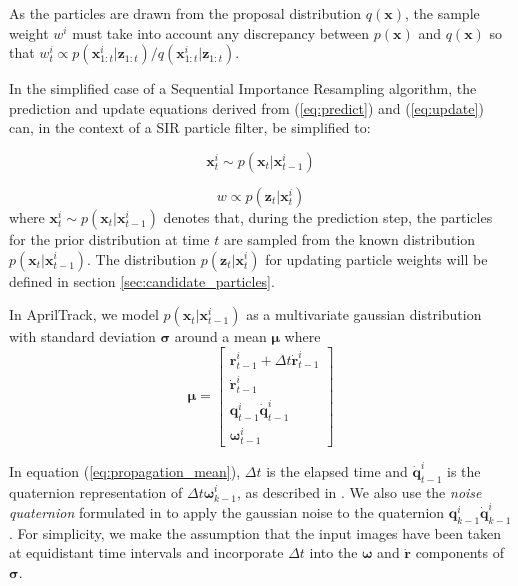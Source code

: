 \documentclass[letterpaper, 10 pt, conference]{ieeeconf}
\renewcommand{\vec}[1]{\boldsymbol{#1}}
\renewcommand{\eqref}[1]{\textup{{\normalfont(\ref{#1}}\normalfont)}}
\begin{document}
As the particles are drawn from the proposal distribution $q(\vec{x})$, the sample weight $w^i$ must take into account any discrepancy between $p(\vec{x})$ and $q(\vec{x})$ so that $w^i_t \propto p(\vec{x}^i_{1:t}|\vec{z}_{1:t})/q(\vec{x}^i_{1:t}|\vec{z}_{1:t})$.

In the simplified case of a Sequential Importance Resampling algorithm, the prediction and update equations derived from \eqref{eq:predict} and \eqref{eq:update} can, in the context of a SIR particle filter, be simplified to:

\begin{equation}
	\vec{x}^i_t \sim p(\vec{x}_t|\vec{x}^i_{t-1})
\end{equation}

\begin{equation}
	w \propto p(\vec{z}_t|\vec{x}^i_t)
\end{equation}
where $\vec{x}^i_t \sim p(\vec{x}_t|\vec{x}^i_{t-1})$ denotes that, during the prediction step, the particles for the prior distribution at time $t$ are sampled from the known distribution $p(\vec{x}_t|\vec{x}^i_{t-1})$. The distribution $p(\vec{z}_t|\vec{x}^i_t)$ for updating particle weights will be defined in section \ref{sec:candidate_particles}.

In AprilTrack, we model $p(\vec{x}_t|\vec{x}^i_{t-1})$ as a multivariate gaussian distribution with standard deviation $\vec{\sigma}$ around a mean $\vec{\mu}$ where
\begin{equation} \label{eq:propagation_mean}
\vec{\mu} = 
\begin{bmatrix} 
	\vec{r}^i_{t-1} + \Delta t \dot{\vec{r}}^i_{t-1} \\
 	\dot{\vec{r}}^i_{t-1} \\
	\vec{q}^i_{t-1} \dot{\vec{q}}^i_{t-1}\\
	\vec{\omega}^i_{t-1}
\end{bmatrix}
\end{equation}

In equation \eqref{eq:propagation_mean}, $\Delta t$ is the elapsed time and $\dot{\vec{q}}^i_{t-1}$ is the quaternion representation of $\Delta t  \vec{\omega}^i_{k-1}$, as described in \cite{KalmanFilter}. We also use the \emph{noise quaternion} formulated in \cite{KalmanFilter} to apply the gaussian noise to the quaternion $\vec{q}^i_{k-1} \dot{\vec{q}}^i_{k-1}$. For simplicity, we make the assumption that the input images have been taken at equidistant time intervals and incorporate $\Delta t$ into the $\vec{\omega}$ and $\dot{\vec{r}}$ components of $\vec{\sigma}$.
\end{document}
